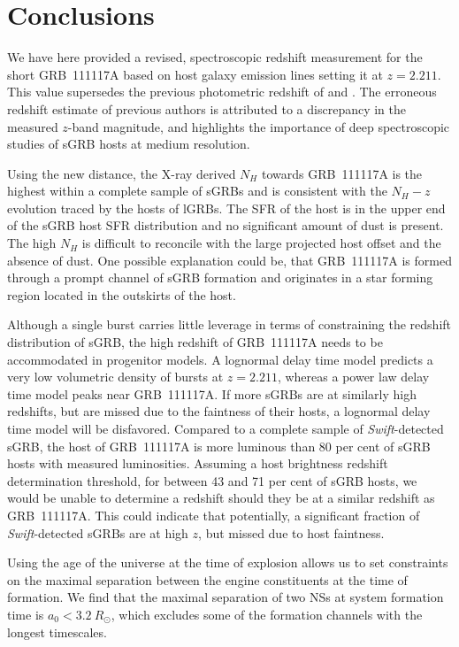 \documentclass{aa}    %
\begin{document}
\section{Conclusions}

We have here provided a revised, spectroscopic redshift measurement for the
short GRB~111117A based on host galaxy emission lines setting it at $z = 2.211$.
This value supersedes the previous photometric redshift of \citet{Margutti2012}
and \citet{Sakamoto2013}. The erroneous redshift estimate of previous authors is
attributed to a discrepancy in the measured $z$-band magnitude, and highlights
the importance of deep spectroscopic studies of sGRB hosts at medium resolution.

Using the new distance, the X-ray derived $N_H$ towards GRB~111117A is the
highest within a complete sample of sGRBs and is consistent with the
$N_H-z$ evolution traced by the hosts of lGRBs. The SFR of the host is in the
upper end of the sGRB host SFR distribution and no significant amount of dust is
present. The high $N_H$ is difficult to reconcile with the large projected host
offset and the absence of dust. One possible explanation could be, that
GRB~111117A is formed through a prompt channel of sGRB formation and originates
in a star forming region located in the outskirts of the host.

Although a single burst carries little leverage in terms of constraining the
redshift distribution of sGRB, the high redshift of GRB~111117A needs to be
accommodated in progenitor models. A lognormal delay time model predicts a very
low volumetric density of bursts at $z = 2.211$, whereas a power law delay time
model peaks near GRB~111117A. If more sGRBs are at similarly high redshifts, but
are missed due to the faintness of their hosts, a lognormal delay time model
will be disfavored. Compared to a complete sample of \textit{Swift}-detected
sGRB, the host of GRB~111117A is more luminous than 80 per cent of sGRB hosts
with measured luminosities. Assuming a host brightness redshift determination
threshold, for between 43 and 71 per cent of sGRB hosts, we would be unable to
determine a redshift should they be at a similar redshift as GRB~111117A. This
could indicate that potentially, a significant fraction of
\textit{Swift}-detected sGRBs are at high $z$, but missed due to host faintness.

Using the age of the universe at the time of explosion allows us to set
constraints on the maximal separation between the engine constituents at the
time of formation. We find that the maximal separation of two NSs at system
formation time is $a_0 < 3.2~R_\odot$, which excludes some of the formation
channels with the longest timescales.
\end{document}
